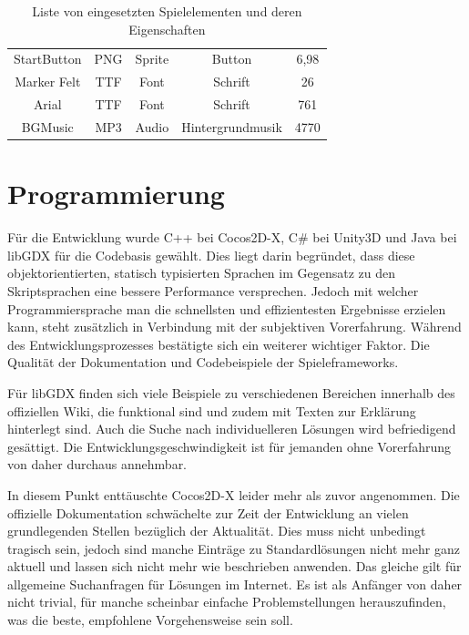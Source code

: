 \begin{table}[htbp]
{\begin{tabular}{ccccc}
			\rowcolor[HTML]{C0C0C0} 
			{\color[HTML]{000000} StartButton} & {\color[HTML]{000000} PNG}      & {\color[HTML]{000000} Sprite}        & {\color[HTML]{000000} Button}           & {\color[HTML]{000000}6,98}           \\
			{\color[HTML]{000000} Marker Felt} & {\color[HTML]{000000} TTF}      & {\color[HTML]{000000} Font}          & {\color[HTML]{000000} Schrift}          & {\color[HTML]{000000}26}           \\
			\rowcolor[HTML]{C0C0C0} 
			{\color[HTML]{000000} Arial}       & {\color[HTML]{000000} TTF}      & {\color[HTML]{000000} Font}          & {\color[HTML]{000000} Schrift}          & {\color[HTML]{000000}761}           \\
			{\color[HTML]{000000} BGMusic}     & {\color[HTML]{000000} MP3}      & {\color[HTML]{000000} Audio}         & {\color[HTML]{000000} Hintergrundmusik} & {\color[HTML]{000000}4770}          
		\end{tabular}
	}
	\caption{Liste von eingesetzten Spielelementen und deren Eigenschaften}
	\label{spiel_komponenten}
\end{table}

\section{Programmierung}
Für die Entwicklung wurde C++ bei Cocos2D-X, C\# bei Unity3D und Java bei libGDX für die Codebasis gewählt. Dies liegt darin begründet, dass diese objektorientierten, statisch typisierten Sprachen im Gegensatz zu den Skriptsprachen eine bessere Performance versprechen. Jedoch mit welcher Programmiersprache man die schnellsten und effizientesten Ergebnisse erzielen kann, steht zusätzlich in Verbindung mit der subjektiven Vorerfahrung.
Während des Entwicklungsprozesses bestätigte sich ein weiterer wichtiger Faktor. Die Qualität der Dokumentation und Codebeispiele der Spieleframeworks. 

\bigskip
Für libGDX finden sich viele Beispiele zu verschiedenen Bereichen innerhalb des offiziellen Wiki, die funktional sind und zudem mit Texten zur Erklärung hinterlegt sind. Auch die Suche nach individuelleren Lösungen wird befriedigend gesättigt. Die Entwicklungsgeschwindigkeit ist für jemanden ohne Vorerfahrung von daher durchaus annehmbar.

\bigskip
In diesem Punkt enttäuschte Cocos2D-X leider mehr als zuvor angenommen. Die offizielle Dokumentation schwächelte zur Zeit der Entwicklung an vielen grundlegenden Stellen bezüglich der Aktualität. Dies muss nicht unbedingt tragisch sein, jedoch sind manche Einträge zu Standardlösungen nicht mehr ganz aktuell und lassen sich nicht mehr wie beschrieben anwenden. Das gleiche gilt für allgemeine Suchanfragen für Lösungen im Internet. Es ist als Anfänger von daher nicht trivial, für manche scheinbar einfache Problemstellungen herauszufinden, was die beste, empfohlene Vorgehensweise sein soll.


